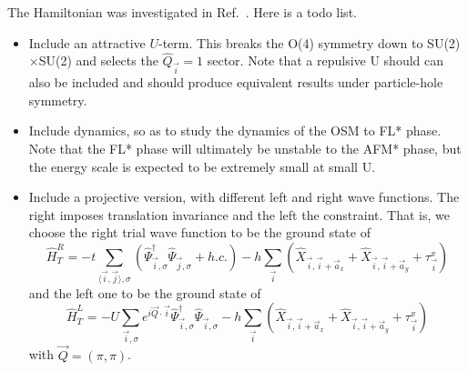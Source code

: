 The Hamiltonian was investigated in Ref.~\cite{Gazit19}.   Here is a todo list. 
\begin{itemize}
\item  Include an attractive $U$-term. This breaks the O(4) symmetry down to SU(2)$\times$SU(2)   and selects the $\hat{Q}_{\vec{i}} =1 $ sector.   Note that a repulsive U should  can also be included and should produce equivalent results under particle-hole symmetry.
\item  Include dynamics, so as to study the dynamics of the OSM to  FL* phase. Note that the FL* phase will ultimately be unstable to the AFM* phase, but the energy scale is expected to be extremely small at small U.  
\item  Include a projective version, with different left and right wave functions. The right imposes translation invariance and  the left  the constraint.  That is,  we choose the right trial wave function to be the ground state of 
\begin{equation}
	\hat{H}_T^{R}  = -  t  \sum_{\langle \vec{i}, \vec{j} \rangle, \sigma } 
	  \left( \hat{\Psi}^{\dagger}_{\vec{i},\sigma} \hat{\Psi}^{\phantom{\dagger}}_{\vec{j},\sigma}    + h.c. \right)  
	  - h \sum_{\vec{i} } \left( \hat{X}_{\vec{i},\vec{i} +  \vec{a}_x }+  \hat{X}_{\vec{i},\vec{i} +  \vec{a}_y}  + \tau^{x}_{\vec{i}} \right)
\end{equation}
and the left one to be the ground state of
\begin{equation}
	\hat{H}_T^{L}  =  - U  \sum_{ \vec{i},  \sigma } 
	    e^{i \vec{Q} \cdot \vec{i} } \hat{\Psi}^{\dagger}_{\vec{i},\sigma} \hat{\Psi}^{\phantom{\dagger}}_{\vec{i},\sigma}  
	  - h \sum_{\vec{i} } \left( \hat{X}_{\vec{i},\vec{i} +  \vec{a}_x }+  \hat{X}_{\vec{i},\vec{i} +  \vec{a}_y}  + \tau^{x}_{\vec{i}} \right)
\end{equation}
with $\vec{Q} = ( \pi,\pi ) $. 
\end{itemize}  